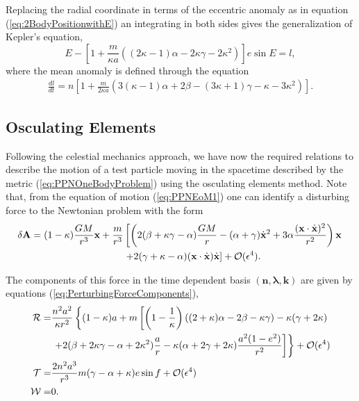 Replacing the radial coordinate in terms of the eccentric anomaly as in equation (\ref{eq:2BodyPositionwithE}) an integrating in both sides gives the generalization of Kepler's equation,
\begin{equation}
E -  \left[ 1 + \frac{m}{\kappa a} \left(  (2\kappa -1)\alpha - 2\kappa \gamma - 2\kappa^2 \right)  \right] e \sin E = l,
\end{equation}
where the mean anomaly is defined through the equation 
\begin{align}
\frac{dl}{dt} = n  \left[ 1 + \frac{m}{2\kappa a} \left( 3(\kappa -1)\alpha + 2\beta - (3\kappa +1)\gamma - \kappa - 3\kappa^2 \right) \right].
\end{align}

\subsection{Osculating Elements}
Following the celestial mechanics approach, we have now the required relations to describe the motion of a test particle moving in the spacetime described by the metric (\ref{eq:PPNOneBodyProblem}) using the osculating elements method. Note that, from the equation of motion (\ref{eq:PPNEoM1}) one can identify a disturbing force to the Newtonian problem with the form
\begin{align}
\delta \textbf{A} = (1- \kappa) \frac{GM}{r^3}\textbf{x} + \frac{m}{r^3} & \left[  \left( 2(\beta + \kappa \gamma -\alpha ) \frac{GM}{r} - (\alpha + \gamma ) \dot{\textbf{x}}^2 + 3\alpha \frac{(\textbf{x} \cdot \dot{\textbf{x}})^2}{r^2} \right) \textbf{x}   \right. \notag \\
& \left. +2(\gamma +\kappa - \alpha)( \textbf{x}\cdot \dot{\textbf{x}} ) \dot{\textbf{x}} \right] + \mathcal{O} ( \epsilon ^4 ).
\end{align}

The components of this force in the time dependent basis $(\textbf{n}, \boldsymbol{\lambda}, \textbf{k})$ are given by equations (\ref{eq:PerturbingForceComponents}), 
\begin{align}
\mathcal{R} = &\frac{n^2 a^2}{\kappa r^2}  \left\lbrace (1 - \kappa)a + m \left[  \left( 1 - \frac{1}{\kappa} \right) \left((2+\kappa)\alpha - 2\beta -\kappa \gamma \right) -\kappa (\gamma + 2\kappa) \right. \right. \notag \\
& \left. \left. + 2(\beta + 2 \kappa \gamma - \alpha + 2 \kappa^2)\frac{a}{r}  - \kappa(\alpha + 2\gamma + 2\kappa ) \frac{a^2 (1-e^2)}{r^2}   \right] \right\rbrace + \mathcal{O} ( \epsilon ^4 ) \\
\mathcal{T} =& \frac{2n^2 a^3}{r^3} m  (\gamma - \alpha + \kappa) e \sin f + \mathcal{O} ( \epsilon ^4 )\\
\mathcal{W} = & 0  .
\end{align}

